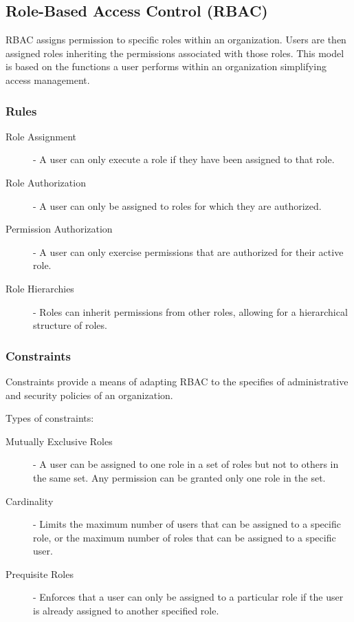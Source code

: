 \documentclass[12pt letter]{report}
\begin{document}
\subsection{Role-Based Access Control (RBAC)}


RBAC assigns permission to specific roles within an organization.
Users are then assigned roles inheriting the permissions associated
with those roles. This model is based on the functions a user
performs within an organization simplifying access management.

\subsubsection{Rules}
\begin{description}
  \item[Role Assignment] - A user can only execute a role if they
    have been assigned to that role.
  \item[Role Authorization] - A user can only be assigned to roles
    for which they are authorized.
  \item[Permission Authorization] - A user can only exercise
    permissions that are authorized for their active role.
  \item[Role Hierarchies] - Roles can inherit permissions from other
    roles, allowing for a hierarchical structure of roles.
\end{description}

\subsubsection{Constraints}


Constraints provide a means of adapting RBAC to the specifies of
administrative and security policies of an organization.

Types of constraints:
\begin{description}
  \item[Mutually Exclusive Roles] - A user can be assigned to one role in a set
    of roles but not to others in the same set. Any permission can be
    granted only one role in the set.
  \item[Cardinality] - Limits the maximum number of users that can be
    assigned to a specific role, or the maximum number of roles that can be
    assigned to a specific user.
  \item[Prequisite Roles] - Enforces that a user can only be assigned
    to a particular role if the user is already assigned to another
    specified role.
\end{description}
\end{document}
